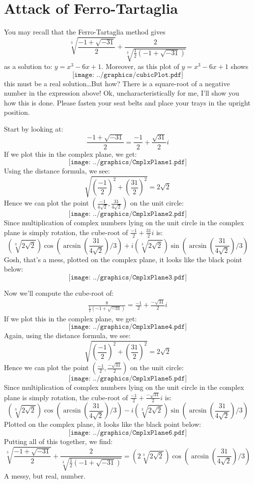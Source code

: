 \newpage
\section{Attack of Ferro-Tartaglia}

You may recall that the Ferro-Tartaglia method gives 
\[
\sqrt[3]{\frac{-1+\sqrt{-31}}{2}} + \frac{2}{\sqrt[3]{\frac{1}{2}(-1+\sqrt{-31})}}
\]
as a solution to: $y = x^3-6x+1$. Moreover, as this plot of $y = x^3-6x+1$ shows
\[
\texttt{[image: ../graphics/cubicPlot.pdf]}
\]
this must be a real solution\dots But how? There is a square-root of a
negative number in the expression above! Ok, uncharacteristically for
me, I'll show you how this is done. Please fasten your seat belts and
place your trays in the upright position.

Start by looking at:
\[
\frac{-1+\sqrt{-31}}{2} = \frac{-1}{2} + \frac{\sqrt{31}}{2} i 
\]
If we plot this in the complex plane, we get:
\[
\texttt{[image: ../graphics/CmplxPlane1.pdf]}
\]
Using the distance formula, we see:
\[
\sqrt{\left( \frac{-1}{2} \right)^2 + \left(\frac{31}{2}\right)^2} = 2\sqrt{2}
\]
Hence we can plot the point $\left(\frac{-1}{4\sqrt{2}}, \frac{31}{4\sqrt{2}}\right)$ on the unit circle:
\[
\texttt{[image: ../graphics/CmplxPlane2.pdf]}
\]
Since multiplication of complex numbers lying on the unit circle in the
complex plane is simply rotation, the cube-root of $\frac{-1}{2} +
\frac{31}{2} i$ is:
\[
\left(\sqrt[3]{2\sqrt{2}}\right)\cos\left(\arcsin\left(\frac{31}{4\sqrt{2}}\right)/3\right) + i \left(\sqrt[3]{2\sqrt{2}}\right) \sin\left( \arcsin\left(\frac{31}{4\sqrt{2}}\right)/3\right)
\]
Gosh, that's a mess, plotted on the complex plane, it looks like the black point below:
\[
\texttt{[image: ../graphics/CmplxPlane3.pdf]}
\]

Now we'll compute the cube-root of: 
\begin{align*}
\frac{8}{\frac{1}{2}(-1+\sqrt{-31})} = \frac{-1}{2} + \frac{-\sqrt{31}}{2} i 
\end{align*}
If we plot this in the complex plane, we get:
\[
\texttt{[image: ../graphics/CmplxPlane4.pdf]}
\]
Again, using the distance formula, we see:
\[
\sqrt{\left( \frac{-1}{2} \right)^2 + \left(\frac{31}{2}\right)^2} = 2\sqrt{2}
\]
Hence we can plot the point $\left(\frac{-1}{2}, \frac{-\sqrt{31}}{2} \right)$ on the unit circle:
\[
\texttt{[image: ../graphics/CmplxPlane5.pdf]}
\]
Since multiplication of complex numbers lying on the unit circle in the
complex plane is simply rotation, the cube-root of $\frac{-1}{2} + \frac{-\sqrt{31}}{2} i $ is:
\[
\left(\sqrt[3]{2\sqrt{2}}\right)\cos\left(\arcsin\left(\frac{31}{4\sqrt{2}}\right)/3\right) - i \left(\sqrt[3]{2\sqrt{2}}\right) \sin\left( \arcsin\left(\frac{31}{4\sqrt{2}}\right)/3\right)
\]
Plotted on the complex plane, it looks like the black point below:
\[
\texttt{[image: ../graphics/CmplxPlane6.pdf]}
\]
Putting all of this together, we find:
\[
\sqrt[3]{\frac{-1+\sqrt{-31}}{2}} + \frac{2}{\sqrt[3]{\frac{1}{2}(-1+\sqrt{-31})}} = \left(2\sqrt[3]{2\sqrt{2}}\right)\cos\left(\arcsin\left(\frac{31}{4\sqrt{2}}\right)/3\right)
\]
A messy, but real, number. 
